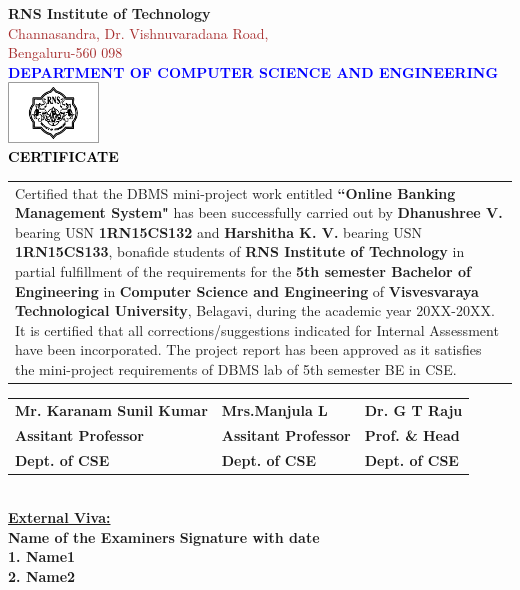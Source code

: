 \thispagestyle{empty}
\begin{center}
\break\break
\textup{\large {\textcolor{darkbrown}{\bf RNS Institute of Technology}} \\ 
{\normalsize{\textcolor{brown}{Channasandra, Dr. Vishnuvaradana Road,\\ Bengaluru-560 098}}}}\\[0.1in]
\textup{\normalsize {\textcolor{blue}{\bf DEPARTMENT OF COMPUTER SCIENCE AND ENGINEERING}}}\\[0.1in]
\includegraphics[width=0.18\textwidth]{./RNSIT.jpg}\\[0.1in]
\textup{\large {\textcolor{black}{\textbf {CERTIFICATE}}}} \\[0.1in]
\end{center}

\justify
\begin{tabular}{p{15cm}}
\hspace{0.4cm} Certified that the DBMS mini-project work entitled \textbf{``Online Banking Management System"} has been successfully carried out by \textbf{Dhanushree V.} bearing USN \textbf{1RN15CS132} and \textbf{Harshitha K. V.} bearing USN \textbf{1RN15CS133}, bonafide students of \textbf{RNS Institute of Technology } in partial fulfillment of the requirements for the \textbf{5th semester Bachelor of Engineering} in \textbf{Computer Science and Engineering} of \textbf{Visvesvaraya Technological University}, Belagavi, during the academic year 20XX-20XX. It is certified that all corrections/suggestions indicated for Internal Assessment have been incorporated. The project report has been approved as it satisfies the mini-project requirements of DBMS lab of 5th semester BE in CSE.\\[0.7in]
\end{tabular}

\justify
\begin{tabular}{l  l  l}
\textbf{Mr. Karanam Sunil Kumar} & \hspace{0.7cm}\textbf{Mrs.Manjula L} & \hspace{0.7cm}\textbf{Dr. G T Raju}\\
\textbf{Assitant Professor} & \hspace{0.7cm}\textbf{Assitant Professor}  & \hspace{0.7cm}\textbf{Prof. \& Head}\\
\textbf{Dept. of CSE} & \hspace{0.7cm}\textbf{Dept. of CSE}  & \hspace{0.7cm}\textbf{Dept. of CSE}\\[0.2in]
\end{tabular}
\\[0.3in]

\justify
\textup{\underline{\textbf{External Viva:}}} \\ 
\textup{\textbf{Name of the Examiners}}\hspace{6cm} {\textbf{Signature with date}} \\
\justify
\textup{\textbf{1. Name1}} \\[0.4in]
\textup{\textbf{2. Name2}}
\newpage